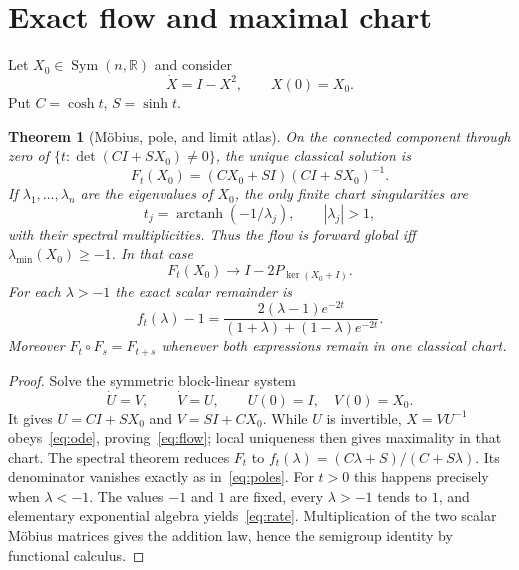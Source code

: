 \documentclass[10pt]{article}
\newtheorem{theorem}{Theorem}
\newcommand{\Sym}{\operatorname{Sym}}
\begin{document}
\section{Exact flow and maximal chart}
Let $X_0\in\Sym(n,\mathbb R)$ and consider
\begin{equation}\label{eq:ode}
 \dot X=I-X^2,\qquad X(0)=X_0.
\end{equation}
Put $C=\cosh t$, $S=\sinh t$.
\begin{theorem}[M\"obius, pole, and limit atlas]\label{thm:atlas}
On the connected component through zero of
$\{t:\det(CI+SX_0)\ne0\}$, the unique classical solution is
\begin{equation}\label{eq:flow}
 F_t(X_0)=(CX_0+SI)(CI+SX_0)^{-1}.
\end{equation}
If $\lambda_1,\ldots,\lambda_n$ are the eigenvalues of $X_0$, the only
finite chart singularities are
\begin{equation}\label{eq:poles}
 t_j=\operatorname{arctanh}(-1/\lambda_j),\qquad |\lambda_j|>1,
\end{equation}
with their spectral multiplicities.  Thus the flow is forward global iff
$\lambda_{\min}(X_0)\ge-1$.  In that case
\begin{equation}\label{eq:limit}
 F_t(X_0)\longrightarrow I-2P_{\ker(X_0+I)}.
\end{equation}
For each $\lambda>-1$ the exact scalar remainder is
\begin{equation}\label{eq:rate}
 f_t(\lambda)-1=
 \frac{2(\lambda-1)e^{-2t}}
 {(1+\lambda)+(1-\lambda)e^{-2t}}.
\end{equation}
Moreover $F_t\circ F_s=F_{t+s}$ whenever both expressions remain in one
classical chart.
\end{theorem}
\begin{proof}
Solve the symmetric block-linear system
\[
 \dot U=V,\qquad \dot V=U,\qquad U(0)=I,\quad V(0)=X_0.
\]
It gives $U=CI+SX_0$ and $V=SI+CX_0$.  While $U$ is invertible,
$X=VU^{-1}$ obeys~\eqref{eq:ode}, proving~\eqref{eq:flow}; local uniqueness
then gives maximality in that chart.  The spectral theorem reduces $F_t$ to
$f_t(\lambda)=(C\lambda+S)/(C+S\lambda)$.  Its denominator vanishes exactly
as in~\eqref{eq:poles}.  For $t>0$ this happens precisely when $\lambda<-1$.
The values $-1$ and $1$ are fixed, every $\lambda>-1$ tends to $1$, and
elementary exponential algebra yields~\eqref{eq:rate}.  Multiplication of
the two scalar M\"obius matrices gives the addition law, hence the semigroup
identity by functional calculus.
\end{proof}
\end{document}
